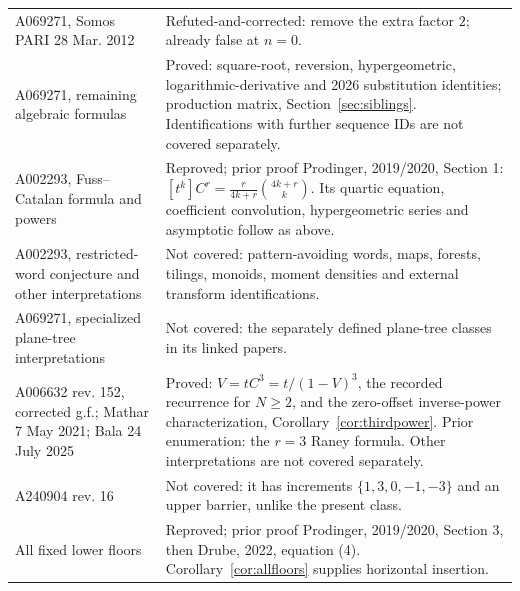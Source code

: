 \documentclass[11pt]{article}
\begin{document}
\begin{longtable}{@{}p{.32\linewidth}p{.62\linewidth}@{}}
A069271, Somos PARI 28 Mar. 2012 & Refuted-and-corrected: remove the extra factor $2$; already false at $n=0$.\\
A069271, remaining algebraic formulas & Proved: square-root, reversion, hypergeometric, logarithmic-derivative and 2026 substitution identities; production matrix, Section~\ref{sec:siblings}. Identifications with further sequence IDs are not covered separately.\\
A002293, Fuss--Catalan formula and powers & Reproved; prior proof Prodinger, 2019/2020, Section 1: $[t^k]C^r=\frac{r}{4k+r}\binom{4k+r}{k}$. Its quartic equation, coefficient convolution, hypergeometric series and asymptotic follow as above.\\
A002293, restricted-word conjecture and other interpretations & Not covered: pattern-avoiding words, maps, forests, tilings, monoids, moment densities and external transform identifications.\\
A069271, specialized plane-tree interpretations & Not covered: the separately defined plane-tree classes in its linked papers.\\
A006632 rev. 152, corrected g.f.; Mathar 7 May 2021; Bala 24 July 2025 & Proved: $V=tC^3=t/(1-V)^3$, the recorded recurrence for $N\geq2$, and the zero-offset inverse-power characterization, Corollary~\ref{cor:thirdpower}. Prior enumeration: the $r=3$ Raney formula. Other interpretations are not covered separately.\\
A240904 rev. 16 & Not covered: it has increments $\{1,3,0,-1,-3\}$ and an upper barrier, unlike the present class.\\
All fixed lower floors & Reproved; prior proof Prodinger, 2019/2020, Section 3, then Drube, 2022, equation (4). Corollary~\ref{cor:allfloors} supplies horizontal insertion.\\
\bottomrule
\end{longtable}\endgroup
\end{document}
